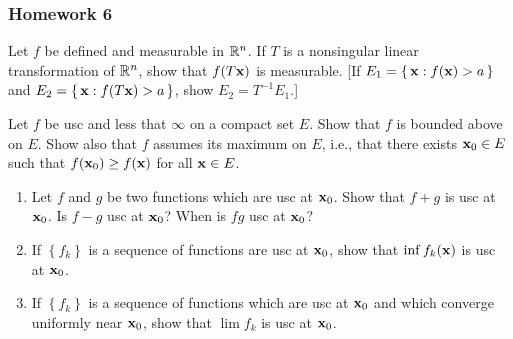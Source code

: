 \subsubsection{Homework 6}
\begin{problem}
  Let $f$ be defined and measurable in $\mathbb{R}^n$. If $T$ is a nonsingular
  linear transformation of $\mathbb{R}^n$, show that $f(T\mathbf{x})$ is
  measurable. [If $E_1=\left\{\,\mathbf{x}: f(\mathbf{x})>a\,\right\}$ and
  $E_2=\left\{\,\mathbf{x}:f(T\mathbf{x})>a\,\right\}$, show $E_2=T^{-1}E_1$.]
\end{problem}
\begin{solution}
\end{solution}

\begin{problem}
  Let $f$ be usc and less that $\infty$ on a compact set $E$. Show that $f$
  is bounded above on $E$. Show also that $f$ assumes its maximum on $E$,
  i.e., that there exists $\mathbf{x}_0\in E$ such that $f(\mathbf{x}_0)\geq f(\mathbf{x})$
  for all $\mathbf{x}\in E$.
\end{problem}
\begin{solution}
\end{solution}

\begin{problem}
  \hfill
  \begin{enumerate}[label=(\alph*),noitemsep]
  \item Let $f$ and $g$ be two functions which are usc at $\mathbf{x}_0$. Show
    that $f+g$ is usc at $\mathbf{x}_0$. Is $f-g$ usc at $\mathbf{x}_0$? When is $fg$
    usc at $\mathbf{x}_0$?
  \item If $\left\{f_k\right\}$ is a sequence of functions are usc at
    $\mathbf{x}_0$, show that $\inf f_k(\mathbf{x})$ is usc at $\mathbf{x}_0$.
  \item If $\left\{f_k\right\}$ is a sequence of functions which are usc at
    $\mathbf{x}_0$ and which converge uniformly near $\mathbf{x}_0$, show that
    $\lim f_k$ is usc at $\mathbf{x}_0$.
  \end{enumerate}
\end{problem}
\begin{solution}
\end{solution}

